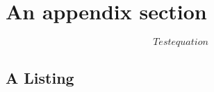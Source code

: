 \documentclass[a4paper,11pt]{mscThesis}
\begin{document}

    
    \section{An appendix section}
\begin{equation}\label{key}
Test equation
\end{equation}
    \subsection{A \matlab Listing}

    \lstset{language=matlab}
    
    
%
%        

%
%

\backmatter
	
	
	
	
	
	\printindex

	\printnomenclature

\end{document}
